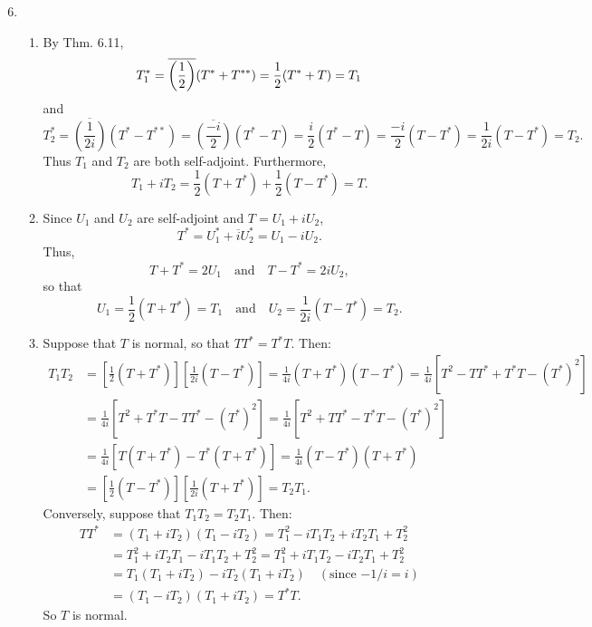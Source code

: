 \documentclass[12pt]{article}
\begin{document}
\begin{enumerate}
\setcounter{enumi}{5}
\item
\begin{enumerate}
\item
By Thm. 6.11,
\begin{equation*}
T_1^* = \overline{\left(\frac{1}{2}\right)} (T^* + T^{**}) = \frac{1}{2} (T^* + T) = T_1 \\
\end{equation*}
and
\begin{equation*}
T_2^* = \overline{\left(\frac{1}{2i}\right)} (T^* - T^{**}) = \overline{\left(\frac{-i}{2}\right)} (T^* - T) = \frac{i}{2} (T^* - T) = \frac{-i}{2} (T - T^*) = \frac{1}{2i} (T - T^*) = T_2.
\end{equation*}
Thus $T_1$ and $T_2$ are both self-adjoint. Furthermore,
\begin{equation*}
T_1 + iT_2 = \frac{1}{2} (T + T^*) + \frac{1}{2} (T - T^*) = T.
\end{equation*}

\item
Since $U_1$ and $U_2$ are self-adjoint and $T = U_1 + iU_2$,
\begin{equation*}
T^* = U_1^* + \overline{i} U_2^* = U_1 - iU_2.
\end{equation*}
Thus,
\begin{equation*}
T + T^* = 2U_1 \quad \text{and} \quad T - T^* = 2iU_2,
\end{equation*}
so that
\begin{equation*}
U_1 = \frac{1}{2} (T + T^*) = T_1 \quad \text{and} \quad U_2 = \frac{1}{2i} (T - T^*) = T_2.
\end{equation*}

\item
Suppose that $T$ is normal, so that $TT^* = T^*T$. Then:
\begin{align*}
T_1 T_2 &= \left[\frac{1}{2} (T + T^*) \right ] \left[\frac{1}{2i} (T - T^*) \right ] = \frac{1}{4i} (T + T^*)(T - T^*) = \frac{1}{4i} [T^2 - TT^* + T^*T - (T^*)^2] \\
&= \frac{1}{4i} [T^2 + T^*T - TT^* - (T^*)^2] = \frac{1}{4i} [T^2 + TT^* - T^*T - (T^*)^2] \\
&= \frac{1}{4i} [T(T + T^*) - T^*(T + T^*)] = \frac{1}{4i} (T - T^*)(T + T^*) \\
&= \left[\frac{1}{2} (T - T^*) \right ] \left[\frac{1}{2i} (T + T^*) \right ] = T_2 T_1.
\end{align*}
Conversely, suppose that $T_1 T_2 = T_2 T_1$. Then:
\begin{align*}
TT^* &= (T_1 + iT_2)(T_1 - iT_2) = T_1^2 - iT_1 T_2 + iT_2 T_1 + T_2^2 \\
&= T_1^2 + iT_2 T_1 - iT_1 T_2 + T_2^2 = T_1^2 + iT_1 T_2 - iT_2 T_1 + T_2^2 \\
&= T_1(T_1 + iT_2) - iT_2(T_1 + iT_2) \quad (\text{since $-1/i = i$}) \\
&= (T_1 - iT_2)(T_1 + iT_2) = T^*T.
\end{align*}
So $T$ is normal.


\end{enumerate}
\end{enumerate}
\end{document}
